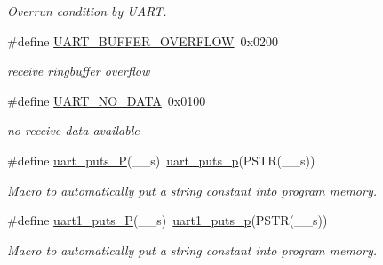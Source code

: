 \begin{DoxyCompactItemize}
\begin{DoxyCompactList}\small\item\em Overrun condition by U\-A\-R\-T. \end{DoxyCompactList}\item 
\hypertarget{group__pfleury__uart_ga94758f3dad6864703b7417d3e40f11df}{\#define \hyperlink{group__pfleury__uart_ga94758f3dad6864703b7417d3e40f11df}{U\-A\-R\-T\-\_\-\-B\-U\-F\-F\-E\-R\-\_\-\-O\-V\-E\-R\-F\-L\-O\-W}~0x0200}\label{group__pfleury__uart_ga94758f3dad6864703b7417d3e40f11df}

\begin{DoxyCompactList}\small\item\em receive ringbuffer overflow \end{DoxyCompactList}\item 
\hypertarget{group__pfleury__uart_ga77ba544d423ff42d400220a05303f268}{\#define \hyperlink{group__pfleury__uart_ga77ba544d423ff42d400220a05303f268}{U\-A\-R\-T\-\_\-\-N\-O\-\_\-\-D\-A\-T\-A}~0x0100}\label{group__pfleury__uart_ga77ba544d423ff42d400220a05303f268}

\begin{DoxyCompactList}\small\item\em no receive data available \end{DoxyCompactList}\item 
\hypertarget{group__pfleury__uart_gae9e143569df2285379bc55f9f5595bf9}{\#define \hyperlink{group__pfleury__uart_gae9e143569df2285379bc55f9f5595bf9}{uart\-\_\-puts\-\_\-\-P}(\-\_\-\-\_\-s)~\hyperlink{group__pfleury__uart_ga6d78b6744db6232f52b4616402036c2f}{uart\-\_\-puts\-\_\-p}(P\-S\-T\-R(\-\_\-\-\_\-s))}\label{group__pfleury__uart_gae9e143569df2285379bc55f9f5595bf9}

\begin{DoxyCompactList}\small\item\em Macro to automatically put a string constant into program memory. \end{DoxyCompactList}\item 
\hypertarget{group__pfleury__uart_gaabd7a5b0c15611ee9ecb2873cc9ee87a}{\#define \hyperlink{group__pfleury__uart_gaabd7a5b0c15611ee9ecb2873cc9ee87a}{uart1\-\_\-puts\-\_\-\-P}(\-\_\-\-\_\-s)~\hyperlink{group__avr-uart_ga1e8074d0a2d5922601c5db2f9777ba79}{uart1\-\_\-puts\-\_\-p}(P\-S\-T\-R(\-\_\-\-\_\-s))}\label{group__pfleury__uart_gaabd7a5b0c15611ee9ecb2873cc9ee87a}

\begin{DoxyCompactList}\small\item\em Macro to automatically put a string constant into program memory. \end{DoxyCompactList}\end{DoxyCompactItemize}
